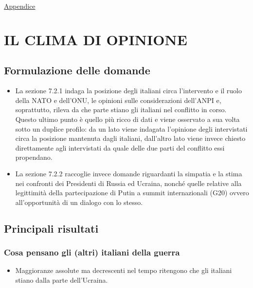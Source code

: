 \documentclass[
  openany]{book}
\providecommand{\tightlist}{%
  \setlength{\itemsep}{0pt}\setlength{\parskip}{0pt}}
\begin{document}
\href{https://github.com/LucianaFazio/Ucrania/blob/main/PDF_Appendice/VI.\%20Gli\%20effetti\%20del\%20conflitto\%20v.3.pdf}{Appendice}

\hypertarget{il-clima-di-opinione}{%
\chapter{IL CLIMA DI OPINIONE}\label{il-clima-di-opinione}}

\hypertarget{formulazione-delle-domande-5}{%
\section{Formulazione delle domande}\label{formulazione-delle-domande-5}}

\begin{itemize}
\item
  La sezione 7.2.1 indaga la posizione degli italiani circa l'intervento e il ruolo della NATO e dell'ONU, le opinioni sulle considerazioni dell'ANPI e, soprattutto, rileva da che parte stiano gli italiani nel conflitto in corso. Questo ultimo punto è quello più ricco di dati e viene osservato a sua volta sotto un duplice profilo: da un lato viene indagata l'opinione degli intervistati circa la posizione mantenuta dagli italiani, dall'altro lato viene invece chiesto direttamente agli intervistati da quale delle due parti del conflitto essi propendano.
\item
  La sezione 7.2.2 raccoglie invece domande riguardanti la simpatia e la stima nei confronti dei Presidenti di Russia ed Ucraina, nonché quelle relative alla legittimità della partecipazione di Putin a summit internazionali (G20) ovvero all'opportunità di un dialogo con lo stesso.
\end{itemize}

\hypertarget{principali-risultati-5}{%
\section{Principali risultati}\label{principali-risultati-5}}

\hypertarget{cosa-pensano-gli-altri-italiani-della-guerra}{%
\subsection{Cosa pensano gli (altri) italiani della guerra}\label{cosa-pensano-gli-altri-italiani-della-guerra}}

\begin{itemize}
\tightlist
\item
  Maggioranze assolute ma decrescenti nel tempo ritengono che gli italiani stiano dalla parte dell'Ucraina.
\end{itemize}
\end{document}

